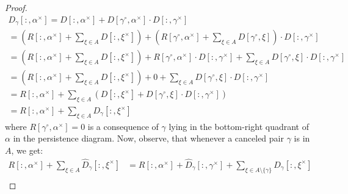 \documentclass[a4paper,12pt, USenglish,cleveref,autoref,thm-restate]{article}
\newcommand{\mR}{R}
\newcommand{\mD}{D}
\newcommand{\bth}[1]{#1^\circ}
\newcommand{\dth}[1]{#1^{\!\times}}
\newcommand{\bds}{\alpha}
\newcommand{\bda}{\xi}
\newcommand{\bdb}{\gamma}
\begin{document}
\begin{appendices}
\begin{proof}
\begin{align*}
    \mD_{\bdb}[:,\dth\bds] = \mD[:,\dth\bds] +  \mD[\bth\bdb,\dth\bds]\cdot \mD[:,\dth\bdb] \\
    = \left(\mR[:,\dth\bds] + \sum\limits_{\bda \in A} \mD[:,\dth\bda]\right) + \left(\mR[\bth\bdb,\dth\bds] +\sum\limits_{\bda \in A} \mD[\bth\bdb,\bda] \right) \cdot \mD[:,\dth\bdb] \\
     = \left(\mR[:,\dth\bds] + \sum\limits_{\bda \in A} \mD[:,\dth\bda]\right) + \mR[\bth\bdb,\dth\bds] \cdot \mD[:,\dth\bdb] +\sum\limits_{\bda \in A} \mD[\bth\bdb,\bda] \cdot \mD[:,\dth\bdb] \\
          = \left(\mR[:,\dth\bds] + \sum\limits_{\bda \in A} \mD[:,\dth\bda]\right) + 0 +\sum\limits_{\bda \in A} \mD[\bth\bdb,\bda] \cdot \mD[:,\dth\bdb] \\
        = \mR[:,\dth\bds] + \sum\limits_{\bda \in A}\left( \mD[:,\dth\bda]+\mD[\bth\bdb,\bda] \cdot \mD[:,\dth\bdb]\right)  \\
        = \mR[:,\dth\bds] + \sum\limits_{\bda \in A} \mD_{\bdb}[:,\dth\bda]
\end{align*}
where $\mR[\bth\bdb,\dth\bds] = 0$ is a consequence of $\bdb$ lying in the bottom-right quadrant of $\bds$ in the persistence diagram. Now, observe, that whenever a canceled pair $\bdb$ is in $A$, we get: 
\begin{align*}
     \mR[:,\dth\bds] + \sum\limits_{\bda \in A} \hat{\mD}_{\bdb}[:,\dth\bda] 
        &= \mR[:,\dth\bds] + \hat{\mD}_{\bdb}[:,\dth\bdb]+\sum\limits_{\bda \in A\setminus\{\bdb\}} \hat{\mD}_{\bdb}[:,\dth\bda] \\

\end{align*}
\end{proof}
\end{appendices}
\end{document}
